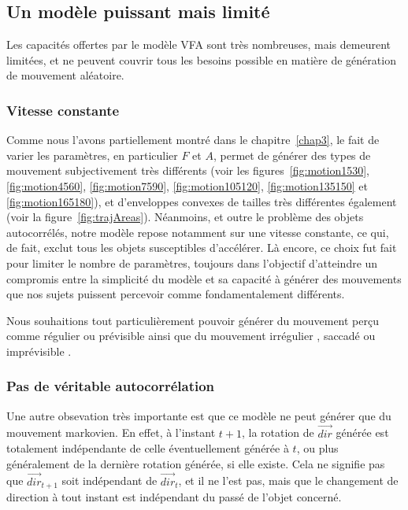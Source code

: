     \subsection{Un modèle puissant mais limité}
	Les capacités offertes par le modèle VFA sont très nombreuses, mais demeurent limitées, et ne peuvent couvrir tous les besoins possible en matière de génération de mouvement aléatoire.
    
    \subsubsection{Vitesse constante}
    Comme nous l'avons partiellement montré dans le chapitre~\ref{chap3}, le fait de varier les paramètres, en particulier $F$ et $A$, permet de générer des types de mouvement subjectivement très différents (voir les figures~\ref{fig:motion1530}, \ref{fig:motion4560}, \ref{fig:motion7590}, \ref{fig:motion105120}, \ref{fig:motion135150} et \ref{fig:motion165180}), et d'enveloppes convexes de tailles très différentes également (voir la figure~\ref{fig:trajAreas}). Néanmoins, et outre le problème des objets autocorrélés, notre modèle repose notamment sur une vitesse constante, ce qui, de fait, exclut tous les objets susceptibles d'accélérer. Là encore, ce choix fut fait pour limiter le nombre de paramètres, toujours dans l'objectif d'atteindre un compromis entre la simplicité du modèle et sa capacité à générer des mouvements que nos sujets puissent percevoir comme fondamentalement différents.
    
	Nous souhaitions tout particulièrement pouvoir générer du mouvement perçu comme \og régulier \fg{} ou \og prévisible \fg{} ainsi que du mouvement \og irrégulier \fg{}, \og saccadé \fg{} ou \og imprévisible \fg{}.
    
   	\subsubsection{Pas de véritable autocorrélation}
	Une autre obsevation très importante est que ce modèle ne peut générer que du mouvement markovien. En effet, à l'instant $t+1$, la rotation de $\vec{dir}$ générée est totalement indépendante de celle éventuellement générée à $t$, ou plus généralement de la dernière rotation générée, si elle existe. Cela ne signifie pas que $\vec{dir}_{t+1}$ soit indépendant de $\vec{dir}_{t}$, et il ne l'est pas, mais que le changement de direction à tout instant est indépendant du passé de l'objet concerné.
    
